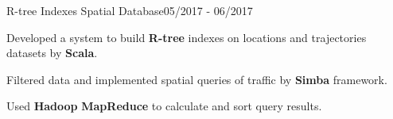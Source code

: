 \begin{rSubsection}{R-tree Indexes Spatial Database}{05/2017 - 06/2017}{}{}
\item Developed a system to build {\bf R-tree} indexes on locations and trajectories datasets by {\bf Scala}.
\item Filtered data and implemented spatial queries of traffic by {\bf Simba} framework.
\item Used {\bf Hadoop} {\bf MapReduce} to calculate and sort query results. 
\end{rSubsection}